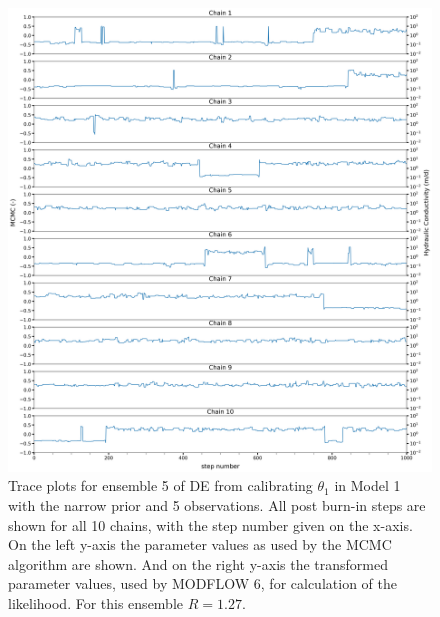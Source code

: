 \begin{figure}[ht]
\centering
\includegraphics[width=1.0\textwidth]{Figures/appendix_figs/trace_plots_ensemble5_DE priornarrow.png}
\caption{Trace plots for ensemble 5 of DE from calibrating  $\theta_1$ in Model 1 with the narrow prior and 5 observations. All post burn-in steps are shown for all 10 chains, with the step number given on the x-axis. On the left y-axis the parameter values as used by the MCMC algorithm are shown. And on the right y-axis the transformed parameter values, used by MODFLOW 6, for calculation of the likelihood. For this ensemble $\hat{R}=1.27$.}\label{traceplot_DE_priornarrow}
\end{figure}

\FloatBarrier
